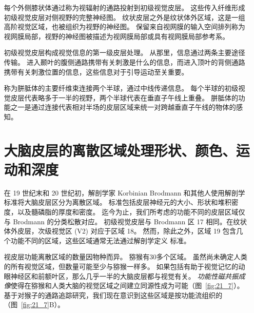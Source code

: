 每个外侧膝状体通过称为视辐射的通路投射到初级视觉皮层。
这些传入纤维形成初级视觉皮层对侧视野的完整神经图。 
纹状皮层之外是纹状体外区域，这是一组高阶视觉区域，也被组织为视野的神经图。
保留来自视网膜的输入空间排列称为视网膜局部，视野的神经图被描述为视网膜局部或具有视网膜局部参考系。


初级视觉皮层构成视觉信息的第一级皮层处理。
从那里，信息通过两条主要途径传输。
进入颞叶的腹侧通路携带有关刺激是什么的信息，而进入顶叶的背侧通路携带有关刺激位置的信息，这些信息对于引导运动至关重要。


称为胼胝体的主要纤维束连接两个半球，通过中线传递信息。
每个半球的初级视觉皮层代表略多于一半的视野，两个半球代表在垂直子午线上重叠。
胼胝体的功能之一是通过连接代表相对半场的皮层区域来统一对跨越垂直子午线的物体的感知。



\section{大脑皮层的离散区域处理形状、颜色、运动和深度}

在 19 世纪末和 20 世纪初，解剖学家 Korbinian Brodmann 和其他人使用解剖学标准将大脑皮层区分为离散区域。
标准包括皮层神经元的大小、形状和堆积密度，以及髓磷脂的厚度和密度。
迄今为止，我们所考虑的功能不同的皮层区域仅与 Brodmann 的分类松散对应。
初级视觉皮层与 Brodmann 区 17 相同。在纹状体外皮层，次级视觉区 (V2) 对应于区域 18。
然而，除此之外，区域 19 包含几个功能不同的区域，这些区域通常无法通过解剖学定义 标准。


视皮层功能离散区域的数量因物种而异。
猕猴有30多个区域。
虽然尚未确定人类的所有视觉区域，但数量可能至少与猕猴一样多。
如果包括有助于视觉记忆的动眼神经区和前额叶区，那么几乎一半的大脑皮层都与视觉有关。
\textit{功能性磁共振成像}使得在猕猴和人类大脑的视觉区域之间建立同源性成为可能（图~\ref{fig:21_7}）。
基于对猴子的通路追踪研究，我们现在意识到这些区域是按功能流组织的（图~\ref{fig:21_7}B）。


